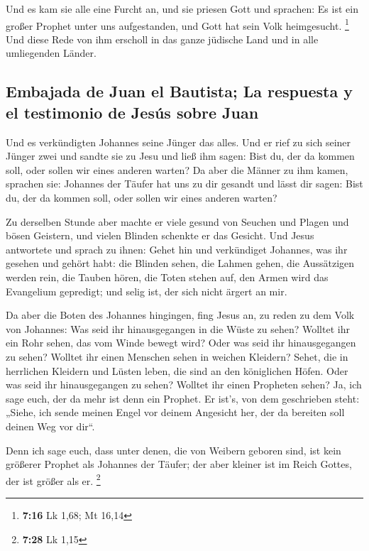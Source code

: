 Und es kam sie alle eine Furcht an, und sie priesen Gott
und sprachen: Es ist ein großer Prophet unter uns aufgestanden, und Gott
hat sein Volk heimgesucht. \footnote{\textbf{7:16} Lk 1,68; Mt 16,14}
 Und diese Rede von ihm erscholl in das ganze jüdische
Land und in alle umliegenden Länder.

\hypertarget{embajada-de-juan-el-bautista-la-respuesta-y-el-testimonio-de-jesuxfas-sobre-juan}{%
\subsection{Embajada de Juan el Bautista; La respuesta y el testimonio
de Jesús sobre
Juan}\label{embajada-de-juan-el-bautista-la-respuesta-y-el-testimonio-de-jesuxfas-sobre-juan}}

 Und es verkündigten Johannes seine Jünger das alles. Und
er rief zu sich seiner Jünger zwei  und sandte sie zu
Jesu und ließ ihm sagen: Bist du, der da kommen soll, oder sollen wir
eines anderen warten?  Da aber die Männer zu ihm kamen,
sprachen sie: Johannes der Täufer hat uns zu dir gesandt und lässt dir
sagen: Bist du, der da kommen soll, oder sollen wir eines anderen
warten?

 Zu derselben Stunde aber machte er viele gesund von
Seuchen und Plagen und bösen Geistern, und vielen Blinden schenkte er
das Gesicht.  Und Jesus antwortete und sprach zu ihnen:
Gehet hin und verkündiget Johannes, was ihr gesehen und gehört habt: die
Blinden sehen, die Lahmen gehen, die Aussätzigen werden rein, die Tauben
hören, die Toten stehen auf, den Armen wird das Evangelium gepredigt;
 und selig ist, der sich nicht ärgert an mir.

 Da aber die Boten des Johannes hingingen, fing Jesus an,
zu reden zu dem Volk von Johannes: Was seid ihr hinausgegangen in die
Wüste zu sehen? Wolltet ihr ein Rohr sehen, das vom Winde bewegt wird?
 Oder was seid ihr hinausgegangen zu sehen? Wolltet ihr
einen Menschen sehen in weichen Kleidern? Sehet, die in herrlichen
Kleidern und Lüsten leben, die sind an den königlichen Höfen.
 Oder was seid ihr hinausgegangen zu sehen? Wolltet ihr
einen Propheten sehen? Ja, ich sage euch, der da mehr ist denn ein
Prophet.  Er ist's, von dem geschrieben steht: „Siehe,
ich sende meinen Engel vor deinem Angesicht her, der da bereiten soll
deinen Weg vor dir``.

 Denn ich sage euch, dass unter denen, die von Weibern
geboren sind, ist kein größerer Prophet als Johannes der Täufer; der
aber kleiner ist im Reich Gottes, der ist größer als er. \footnote{\textbf{7:28}
  Lk 1,15}

